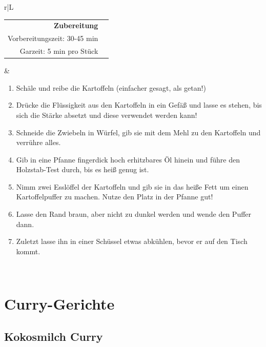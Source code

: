 \documentclass[a4paper, 12pt]{scrbook} 								%
\numberwithin{equation}{section} 									%
\begin{document}
		\newpage
		\begin{tabularx}{\textwidth}{r|L}	


			\begin{tabular}[t]{rr}
				\textbf{Zubereitung}	\\
				Vorbereitungszeit: 30-45 min	\\
				Garzeit: 5 min pro Stück		\\
			\end{tabular}			&	\begin{enumerate}[]
											\item Schäle und reibe die Kartoffeln (einfacher gesagt, als getan!)
											\item Drücke die Flüssigkeit aus den Kartoffeln in ein Gefäß und lasse es stehen, bis sich die Stärke absetzt und diese verwendet werden kann!
											\item Schneide die Zwiebeln in Würfel, gib sie mit dem Mehl zu den Kartoffeln und verrühre alles.
											\item Gib in eine Pfanne fingerdick hoch erhitzbares Öl hinein und führe den Holzstab-Test durch, bis es heiß genug ist.
											\item Nimm zwei Esslöffel der Kartoffeln und gib sie in das heiße Fett um einen Kartoffelpuffer zu machen. Nutze den Platz in der Pfanne gut!
											\item Lasse den Rand braun, aber nicht zu dunkel werden und wende den Puffer dann.
											\item Zuletzt lasse ihn in einer Schüssel etwas abkühlen, bevor er auf den Tisch kommt. 
										\end{enumerate}	\\
		\end{tabularx}
		\newpage

		\section{Curry-Gerichte}


			\subsection{Kokosmilch Curry}	\label{kokos_curry}
\end{document}
